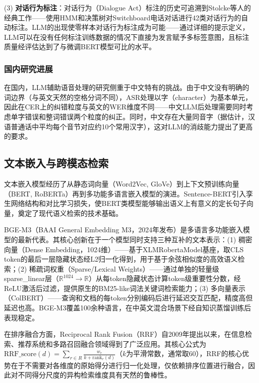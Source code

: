 \documentclass[12pt, a4paper]{article}
\begin{document}
(3) \textbf{对话行为标注}：对话行为（Dialogue Act）标注的历史可追溯到Stolcke等人\cite{stolcke2000dialogue}的经典工作——使用HMM和决策树对Switchboard电话对话进行42类对话行为的自动标注。LLM的出现使零样本对话行为标注成为可能——通过详细的提示定义，LLM可以在没有任何标注训练数据的情况下直接为发言赋予多标签意图，且标注质量经评估达到了与微调BERT模型可比的水平\cite{ouyang2022instructgpt}。

\subsubsection{国内研究进展}

在国内，LLM辅助语音处理的研究侧重于中文特有的挑战。由于中文没有明确的词边界（与英文天然的空格分词不同），ASR处理以字（character）为基本单元，因此在CER上的纠错粒度与英文的WER维度不同——中文LLM后处理需要同时考虑单字错误和整词错误两个粒度的纠正。同时，中文存在大量同音字（据估计，汉语普通话中平均每个音节对应约10个常用汉字），这对LLM的消歧能力提出了更高的要求。

\subsection{文本嵌入与跨模态检索}

文本嵌入模型经历了从静态词向量（Word2Vec, GloVe）到上下文预训练向量（BERT, RoBERTa\cite{liu2019roberta}）再到多功能多语言嵌入模型的演进。Sentence-BERT\cite{reimers2019sbert}引入孪生网络结构和对比学习损失，使BERT类模型能够输出语义上有意义的定长句子向量，奠定了现代语义检索的技术基础。

BGE-M3\cite{chen2024bge}（BAAI General Embedding M3，2024年发布）是多语言多功能嵌入模型的最新代表。其核心创新在于一个模型同时支持三种互补的文本表示：(1) 稠密向量（Dense Embedding，1024维）——基于XLMRobertaModel基座，取CLS token的最后一层隐藏状态经L2归一化得到，用于基于余弦相似度的高效语义检索；(2) 稀疏词权重（Sparse/Lexical Weights）——通过单独的轻量级sparse\_linear层（$\mathbb{R}^{1024} \rightarrow \mathbb{R}$）从每token隐藏状态计算token级重要性分数，经ReLU激活后过滤，提供原生的BM25-like词法关键词检索能力；(3) 多向量表示（ColBERT）——查询和文档的每token分别编码后进行延迟交互匹配，精度高但延迟也高。BGE-M3覆盖100余种语言，在中英文混合场景下经自知识蒸馏训练后表现稳定。

在排序融合方面，Reciprocal Rank Fusion（RRF）\cite{cormack2009rrf}自2009年提出以来，在信息检索、推荐系统和多路召回融合领域得到了广泛应用。其核心公式为$\text{RRF\_score}(d) = \sum_{r \in R} \frac{w_r}{k + \text{rank}_r(d)}$（$k$为平滑常数，通常取60），RRF的核心优势在于不需要对各维度的原始得分进行归一化处理，仅依赖排序位置进行融合，因此对不同得分尺度的异构检索维度具有天然的鲁棒性。
\end{document}
